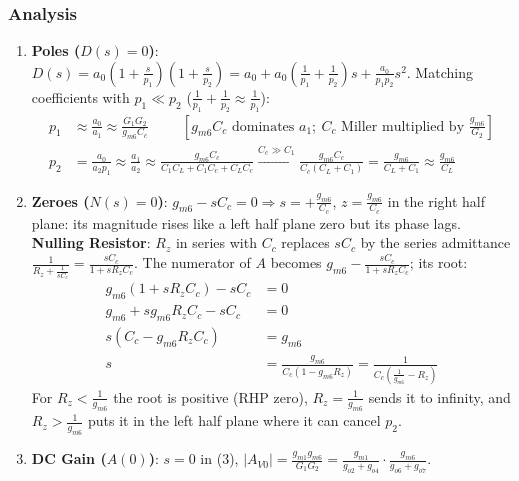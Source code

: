 \subsubsection{Analysis}
\begin{enumerate}
  \item \textbf{Poles (\(D(s) = 0\))}: \(D(s) = a_0\left(1 + \frac{s}{p_1}\right)\left(1 + \frac{s}{p_2}\right) = a_0 + a_0\left(\frac{1}{p_1} + \frac{1}{p_2}\right)s + \frac{a_0}{p_1 p_2}s^2\).
    Matching coefficients with \(p_1 \ll p_2\) (\(\frac{1}{p_1} + \frac{1}{p_2} \approx \frac{1}{p_1}\)):
    \begin{align*}
      p_1 &\approx \frac{a_0}{a_1} \approx \frac{G_1 G_2}{g_{m6} C_c} \hspace{1cm} [g_{m6} C_c \text{ dominates } a_1;\ C_c \text{ Miller multiplied by } \tfrac{g_{m6}}{G_2}] \\
      p_2 &= \frac{a_0}{a_2 p_1} \approx \frac{a_1}{a_2} \approx \frac{g_{m6} C_c}{C_1 C_L + C_1 C_c + C_L C_c} \xrightarrow{C_c \gg C_1} \frac{g_{m6} C_c}{C_c (C_L + C_1)} = \frac{g_{m6}}{C_L + C_1} \approx \frac{g_{m6}}{C_L}
    \end{align*}
  \item \textbf{Zeroes (\(N(s) = 0\))}: \(g_{m6} - sC_c = 0 \Rightarrow s = +\frac{g_{m6}}{C_c}\), \(z = \frac{g_{m6}}{C_c}\) in
    the right half plane: its magnitude rises like a left half plane zero but
    its phase lags.
    \textbf{Nulling Resistor}: \(R_z\) in series with \(C_c\) replaces \(sC_c\) by the
    series admittance \(\frac{1}{R_z + \frac{1}{sC_c}} = \frac{sC_c}{1 + sR_z C_c}\). The numerator of \(A\)
    becomes \(g_{m6} - \frac{sC_c}{1 + sR_z C_c}\); its root:
    \begin{align*}
      g_{m6}(1 + sR_z C_c) - sC_c &= 0 \\
      g_{m6} + s g_{m6} R_z C_c - s C_c &= 0 \\
      s(C_c - g_{m6} R_z C_c) &= g_{m6} \\
      s &= \frac{g_{m6}}{C_c(1 - g_{m6} R_z)} = \frac{1}{C_c\left(\frac{1}{g_{m6}} - R_z\right)}
    \end{align*}
    For \(R_z < \frac{1}{g_{m6}}\) the root is positive (RHP zero), \(R_z = \frac{1}{g_{m6}}\) sends
    it to infinity, and \(R_z > \frac{1}{g_{m6}}\) puts it in the left half plane where
    it can cancel \(p_2\).
  \item \textbf{DC Gain (\(A(0)\))}: \(s = 0\) in (3),
    \(|A_{V0}| = \frac{g_{m1} g_{m6}}{G_1 G_2} = \frac{g_{m1}}{g_{o2} + g_{o4}} \cdot \frac{g_{m6}}{g_{o6} + g_{o7}}\).

\end{enumerate}
